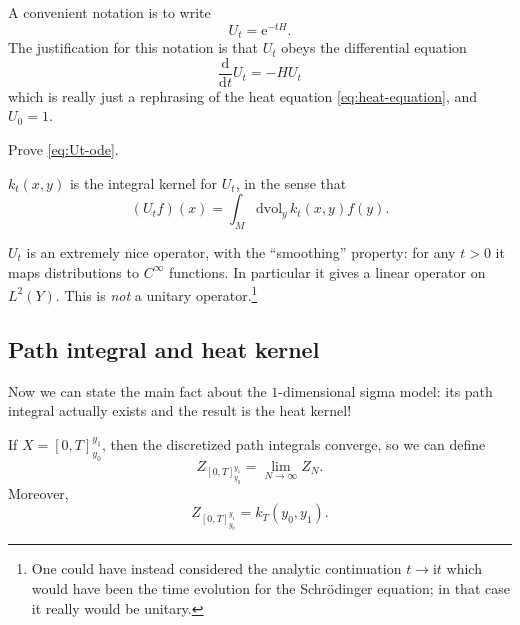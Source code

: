 \documentclass[12pt,letterpaper,reqno]{article}
\numberwithin{equation}{section}
\newcommand{\I}{{\mathrm i}}
\newcommand{\e}{{\mathrm e}}
\newcommand{\de}{\mathrm{d}}
\newcommand{\vol}{\mathrm{vol}}
\newcommand{\ti}[1]{\textit{#1}}
\begin{document}
A convenient notation is to write
\begin{equation}
 U_t = \e^{-t H}.
\end{equation}
The justification for this notation is that $U_t$ obeys the differential equation
\begin{equation} \label{eq:Ut-ode}
  \frac{\de}{\de t} U_t = -H U_t
\end{equation}
which is really just a rephrasing of the heat equation \eqref{eq:heat-equation},
and $U_0 = 1$.

\begin{exercise}
Prove \eqref{eq:Ut-ode}.
\end{exercise}

\begin{prop} $k_t(x,y)$ is the integral kernel for $U_t$, in the sense that
\begin{equation}
  (U_t f)(x) = \int_M \de \vol_y \, k_t(x,y) f(y). 
\end{equation}
\end{prop}

$U_t$ is an extremely nice operator, with the
``smoothing'' property: for any
$t > 0$ it maps
distributions to $C^\infty$ functions. In particular
it gives a linear operator on $L^2(Y)$.
This is \ti{not} a unitary operator.\footnote{One could have instead considered
the analytic continuation $t \to \I t$ which would
have been the time evolution for the Schr\"odinger equation;
in that case it really would be unitary.}



\subsection{Path integral and heat kernel}

Now we can state the main fact about the $1$-dimensional sigma model:
its path integral actually exists and the result is the heat kernel!

\begin{prop} \label{prop:sigma-heat}
If $X = [0,T]_{y_0}^{y_1}$,
then the discretized path integrals converge, so we can define
\begin{equation}
Z_{[0,T]_{y_0}^{y_1}} = \lim_{N \to \infty} Z_N.
\end{equation}
Moreover,
\begin{equation}
Z_{[0,T]_{y_0}^{y_1}} = k_T(y_0,y_1).
\end{equation}
\end{prop}
\end{document}
